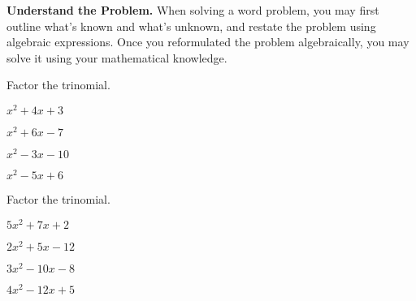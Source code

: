 	\begin{trick} \textbf{Understand the Problem.}
		When solving a word problem, you may first outline what's known and what's unknown, and restate the problem using algebraic expressions. Once you reformulated the problem algebraically, you may solve it using your mathematical knowledge.
	\end{trick}




\newpage



\begin{exercise}
	Factor the trinomial.

	\noindent
	\begin{enumerate*}[label={(\arabic*)~}]
		\item $x^2+4x+3$
		\item $x^2+6x-7$
		\item $x^2-3x-10$
		\item $x^2-5x+6$
		\hfill\null
	\end{enumerate*}
\end{exercise}

\vfill
\begin{center} \hfill
\end{center}


\begin{exercise} Factor the trinomial.

	\noindent
	\begin{enumerate*}[label={(\arabic*)~}]
		\item $5x^2+7x+2$
		\item $2x^2+5x-12$
		\item $3x^2-10x-8$
		\item $4x^2-12x+5$\hspace{\fill}\null
	\end{enumerate*}
\end{exercise}


